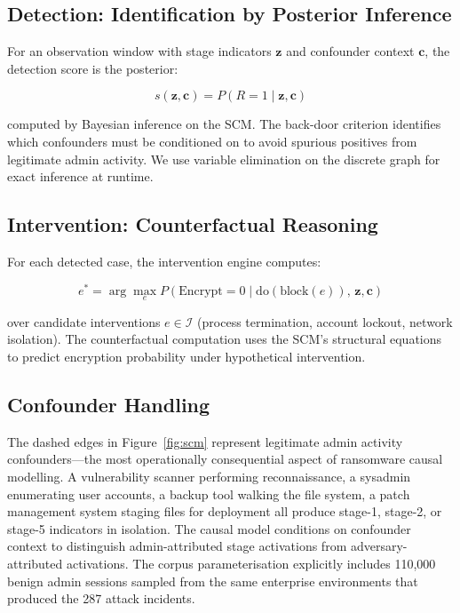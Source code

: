 \documentclass[sigconf,nonacm]{acmart}
\begin{document}
\subsection{Detection: Identification by Posterior Inference}

For an observation window with stage indicators $\mathbf{z}$ and
confounder context $\mathbf{c}$, the detection score is the posterior:

\begin{equation}
  s(\mathbf{z}, \mathbf{c}) = P(R = 1 \mid \mathbf{z}, \mathbf{c})
\end{equation}

computed by Bayesian inference on the SCM. The back-door criterion
identifies which confounders must be conditioned on to avoid
spurious positives from legitimate admin activity. We use
variable elimination on the discrete graph for exact inference at
runtime.

\subsection{Intervention: Counterfactual Reasoning}

For each detected case, the intervention engine computes:

\begin{equation}
  e^* = \arg\max_e P(\text{Encrypt} = 0 \mid
  \mathrm{do}(\text{block}(e)),\, \mathbf{z}, \mathbf{c})
\end{equation}

over candidate interventions $e \in \mathcal{I}$ (process termination,
account lockout, network isolation). The counterfactual computation
uses the SCM's structural equations to predict encryption probability
under hypothetical intervention.

\subsection{Confounder Handling}

The dashed edges in Figure~\ref{fig:scm} represent legitimate admin
activity confounders---the most operationally consequential aspect of
ransomware causal modelling. A vulnerability scanner performing
reconnaissance, a sysadmin enumerating user accounts, a backup tool
walking the file system, a patch management system staging files for
deployment all produce stage-1, stage-2, or stage-5 indicators in
isolation. The causal model conditions on confounder context to
distinguish admin-attributed stage activations from
adversary-attributed activations. The corpus parameterisation
explicitly includes 110{,}000 benign admin sessions sampled from the
same enterprise environments that produced the 287 attack incidents.
\end{document}
